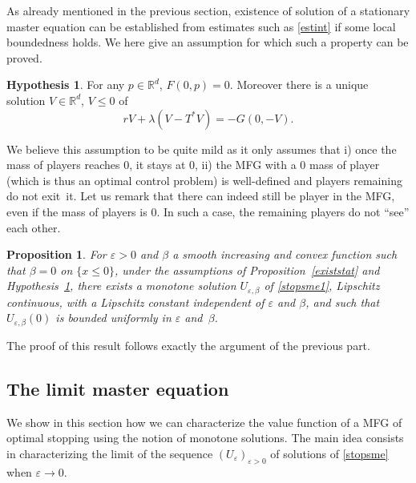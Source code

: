 \documentclass[10pt]{amsart}
\let\epsilon\varepsilon
\newtheorem{Prop}{Proposition}[section]
\theoremstyle{definition}
\newtheorem{hyp}{Hypothesis}
\begin{document}
As already mentioned in the previous section, existence of solution of a stationary master equation can be established from estimates such as \eqref{estint} if some local boundedness holds. We here give an assumption for which such a property can be proved.
\begin{hyp}\label{existstop}
For any $p\in \mathbb{R}^d$, $F(0,p) = 0$. Moreover there is a unique solution $V \in \mathbb{R}^d$, $V \leq 0$ of\vspace*{-5pt}
\begin{equation*}
rV+\lambda (V-T^*V) = -G(0,-V).
\end{equation*}
\end{hyp}
We believe this assumption to be quite mild as it only assumes that i) once the mass of players reaches $0$, it stays at $0$, ii) the MFG with a $0$ mass of player (which is thus an optimal control problem) is well-defined and players remaining do not exit~it. Let us remark that there can indeed still be player in the MFG, even if the mass of players is $0$. In such a case, the remaining players do not ``see'' each other.
\begin{Prop}\label{resume}
For $\epsilon > 0$ and $\beta$ a smooth increasing and convex function such that $\beta =0 $ on $\{x \leq 0\}$, under the assumptions of Proposition~\ref{existstat} and Hypothesis~\ref{existstop}, there exists a monotone solution $U_{\epsilon,\beta}$ of \eqref{stopsme1}, Lipschitz continuous, with a Lipschitz constant independent of $\epsilon$ and $\beta$, and such that $U_{\epsilon,\beta}(0)$ is bounded uniformly in $\epsilon$ and~$\beta$.
\end{Prop}
The proof of this result follows exactly the argument of the previous part.

\subsection{The limit master equation}
We show in this section how we can characterize the value function of a MFG of optimal stopping using the notion of monotone solutions. The main idea consists in characterizing the limit of the sequence $(U_{\epsilon})_{\epsilon > 0}$ of solutions of \eqref{stopsme} when $\epsilon \to 0$.
\end{document}
